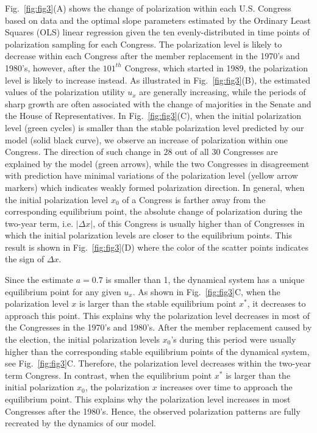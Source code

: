 Fig.~\ref{fig:fig3}(A) shows the change of polarization within each U.S. Congress based on data and the optimal slope parameters estimated by the Ordinary Least Squares (OLS) linear regression given the ten evenly-distributed in time points of polarization sampling for each Congress. The polarization level is likely to decrease within each Congress after the member replacement in the 1970's and 1980's, however, after the $101^{th}$ Congress, which started in 1989, the polarization level is likely to increase instead. As illustrated in Fig.~\ref{fig:fig3}(B), the estimated values of the polarization utility $u_x$ are generally increasing, while the periods of sharp growth are often associated with the change of majorities in the Senate and the House of Representatives. In Fig.~\ref{fig:fig3}(C), when the initial polarization level (green cycles) is smaller than the stable polarization level predicted by our model (solid black curve), we observe an increase of polarization within one Congress. The direction of such change in $28$ out of all $30$ Congresses are explained by the model (green arrows), while the two Congresses in disagreement with prediction have minimal variations of the polarization level (yellow arrow markers) which indicates weakly formed polarization direction. In general, when the initial polarization level $x_0$ of a Congress is farther away from the corresponding equilibrium point, the absolute change of polarization during the two-year term, i.e. $|\Delta x|$, of this Congress is usually higher than of Congresses in which the initial polarization levels are closer to the equilibrium points. This result is shown in Fig.~\ref{fig:fig3}(D) where the color of the scatter points indicates the sign of $\Delta x$.

Since the estimate $a=0.7$ is smaller than 1, the dynamical system has a unique equilibrium point for any given $u_x$. As shown in Fig.~\ref{fig:fig3}C, when the polarization level $x$ is larger than the stable equilibrium point $x^*$, it decreases to approach this point. This explains why the polarization level decreases in most of the Congresses in the 1970's and 1980's. After the member replacement caused by the election, the initial polarization levels $x_0$'s during this period were usually higher than the corresponding stable equilibrium points of the dynamical system, see Fig.~\ref{fig:fig3}C. Therefore, the polarization level decreases within the two-year term Congress. In contrast, when the equilibrium point $x^*$ is larger than the initial polarization $x_0$, the polarization $x$ increases over time to approach the equilibrium point. This explains why the polarization level increases in most Congresses after the 1980's. Hence, the observed polarization patterns are fully recreated by the dynamics of our model.

